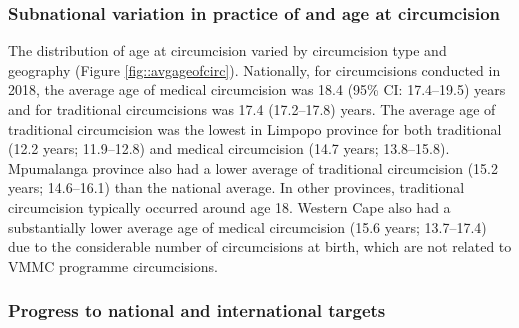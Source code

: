\documentclass{article}
\begin{document}

\subsubsection*{Subnational variation in practice of and age at circumcision}



The distribution of age at circumcision varied by circumcision type and geography (Figure \ref{fig::avgageofcirc}). Nationally, for circumcisions conducted in 2018, the average age of medical circumcision was 18.4 (95\% CI: 17.4--19.5) years and for traditional circumcisions was 17.4 (17.2--17.8) years. The average age of traditional circumcision was the lowest in Limpopo province for both traditional (12.2 years; 11.9--12.8) and medical circumcision (14.7 years; 13.8--15.8). Mpumalanga province also had a lower average of traditional circumcision (15.2 years; 14.6--16.1) than the national average. In other provinces, traditional circumcision typically occurred around age 18. Western Cape also had a substantially lower average age of medical circumcision (15.6 years; 13.7--17.4) due to the considerable number of circumcisions at birth, which are not related to VMMC programme circumcisions.


\subsubsection*{Progress to national and international targets}


\end{document}
